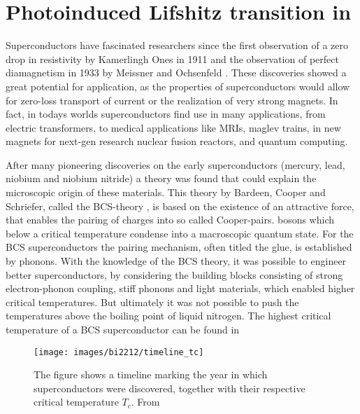 \chapter{Photoinduced Lifshitz transition in }
\label{ch:bi2212}

Superconductors have fascinated researchers since the first observation of a zero drop in resistivity by Kamerlingh Ones in 1911 \cite{van_delft_discovery_2010} and the observation of perfect diamagnetism in 1933 by Meissner and Ochsenfeld \cite{meissner_neuer_1933}.
These discoveries showed a great potential for application, as the properties of superconductors would allow for zero-loss transport of current or the realization of very strong magnets.
In fact, in todays worlds superconductors find use in many applications, from electric transformers, to medical applications like MRIs, maglev trains, in new magnets for next-gen research nuclear fusion reactors, and quantum computing.

After many pioneering discoveries on the early superconductors (mercury, lead, niobium and niobium nitride) a theory was found that could explain the microscopic origin of these materials.
This theory by Bardeen, Cooper and Schriefer, called the BCS-theory \cite{bardeen_theory_1957}, is based on the existence of an attractive force, that enables the pairing of charges into so called Cooper-pairs. bosons which below a critical temperature condense into a macroscopic quantum state.
For the BCS superconductors the pairing mechanism, often titled the glue, is established by phonons.
With the knowledge of the BCS theory, it was possible to engineer better superconductors, by considering the building blocks consisting of strong electron-phonon coupling, stiff phonons and light materials, which enabled higher critical temperatures.
But ultimately it was not possible to push the temperatures above the boiling point of liquid nitrogen.
The highest critical temperature of a BCS superconductor can be found in 

\begin{figure}
	\centering
	\texttt{[image: images/bi2212/timeline\_tc]}
	\caption{The figure shows a timeline marking the year in which superconductors were discovered, together with their respective critical temperature $T_c$. From \cite{pjray_english_2015}}
	\label{fig:timeline}
\end{figure}

